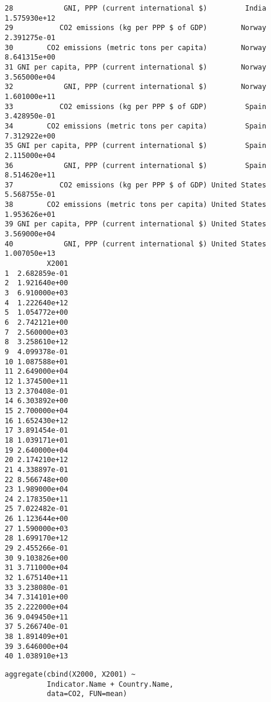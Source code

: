 \documentclass[xcolor={usenames,svgnames,dvipsnames}]{beamer}
\begin{document}
\begin{frame}[fragile]
\begin{verbatim}
28            GNI, PPP (current international $)         India 1.575930e+12
29           CO2 emissions (kg per PPP $ of GDP)        Norway 2.391275e-01
30        CO2 emissions (metric tons per capita)        Norway 8.641315e+00
31 GNI per capita, PPP (current international $)        Norway 3.565000e+04
32            GNI, PPP (current international $)        Norway 1.601000e+11
33           CO2 emissions (kg per PPP $ of GDP)         Spain 3.428950e-01
34        CO2 emissions (metric tons per capita)         Spain 7.312922e+00
35 GNI per capita, PPP (current international $)         Spain 2.115000e+04
36            GNI, PPP (current international $)         Spain 8.514620e+11
37           CO2 emissions (kg per PPP $ of GDP) United States 5.568755e-01
38        CO2 emissions (metric tons per capita) United States 1.953626e+01
39 GNI per capita, PPP (current international $) United States 3.569000e+04
40            GNI, PPP (current international $) United States 1.007050e+13
          X2001
1  2.682859e-01
2  1.921640e+00
3  6.910000e+03
4  1.222640e+12
5  1.054772e+00
6  2.742121e+00
7  2.560000e+03
8  3.258610e+12
9  4.099378e-01
10 1.087588e+01
11 2.649000e+04
12 1.374500e+11
13 2.370408e-01
14 6.303892e+00
15 2.700000e+04
16 1.652430e+12
17 3.891454e-01
18 1.039171e+01
19 2.640000e+04
20 2.174210e+12
21 4.338897e-01
22 8.566748e+00
23 1.989000e+04
24 2.178350e+11
25 7.022482e-01
26 1.123644e+00
27 1.590000e+03
28 1.699170e+12
29 2.455266e-01
30 9.103826e+00
31 3.711000e+04
32 1.675140e+11
33 3.238080e-01
34 7.314101e+00
35 2.222000e+04
36 9.049450e+11
37 5.266740e-01
38 1.891409e+01
39 3.646000e+04
40 1.038910e+13
\end{verbatim}


\lstset{language=R}
\begin{lstlisting}
aggregate(cbind(X2000, X2001) ~
          Indicator.Name + Country.Name,
          data=CO2, FUN=mean)
\end{lstlisting}



\end{frame}
\end{document}
